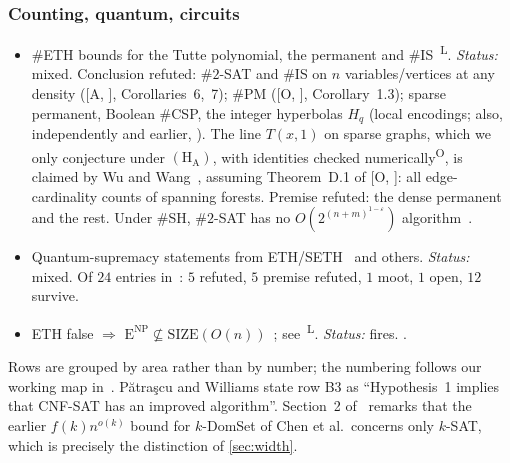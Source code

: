 \documentclass[10pt]{amsart}
\theoremstyle{plain}
\theoremstyle{definition}
\theoremstyle{remark}
\numberwithin{equation}{section}
\newcommand{\A}[1][]{\textup{[A\if\relax\detokenize{#1}\relax\else, #1\fi]}}
\newcommand{\Oa}[1][]{\textup{[O\if\relax\detokenize{#1}\relax\else, #1\fi]}}
\newcommand{\ENP}{\mathrm{E}^{\mathrm{NP}}}
\newcommand{\HA}{\ensuremath{(\mathrm{H}_{\mathrm{A}})}}
\newcommand{\Lit}{\textsuperscript{L}}
\newcommand{\Own}{\textsuperscript{O}}
\begin{document}
{\subsubsection*{Counting, quantum, circuits}
\begin{itemize}[leftmargin=2.6em,itemsep=2pt]
\item[B17] $\#$ETH bounds for the Tutte polynomial, the permanent and $\#$IS~\cite{DHMTW14,Curticapean18,BrandDellRoth19}\Lit. \emph{Status:} mixed. Conclusion refuted: $\#2$-SAT and $\#$IS on $n$ variables/vertices at any density (\A, Corollaries~6,~7); $\#$PM (\Oa, Corollary~1.3); sparse permanent, Boolean $\#$CSP, the integer hyperbolas $H_q$ (local encodings; also, independently and earlier, \cite{Bhattacharjee26}). The line $T(x,1)$ on sparse graphs, which we only conjecture under \HA, with identities checked numerically\Own, is claimed by Wu and Wang~\cite[Cor.~10]{WW26f}, assuming Theorem~D.1 of \Oa: all edge-cardinality counts of spanning forests. Premise refuted: the dense permanent and the rest. Under $\#$SH, $\#2$-SAT has no $O(2^{(n+m)^{1-\varepsilon}})$ algorithm~\cite[Cor.~5.1]{MIT26}.
\item[B18] Quantum-supremacy statements from ETH/SETH~\cite{MT19a} and others. \emph{Status:} mixed. Of $24$ entries in~\cite[\S6.2]{TulsyanQ26}: $5$ refuted, $5$ premise refuted, $1$ moot, $1$ open, $12$ survive.
\item[B27] ETH false $\Rightarrow$ $\ENP\not\subseteq\mathrm{SIZE}(O(n))$~\cite[Thm.~6.1]{Wil13}; see~\cite{JMV15}\Lit. \emph{Status:} fires. .
\end{itemize}
}


\noindent Rows are grouped by area rather than by number; the numbering follows our working map
in~\cite{TulsyanRepo26}. P\u{a}tra\c{s}cu and Williams state row B3 as ``Hypothesis~1 implies that
CNF-SAT has an improved algorithm''. Section~2 of~\cite{PW10} remarks that the earlier
$f(k)n^{o(k)}$ bound for $k$-DomSet of Chen et al.\ concerns only $k$-SAT, which is precisely the
distinction of \cref{sec:width}.
\end{document}
